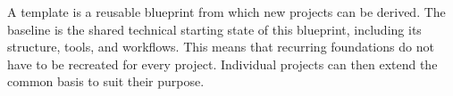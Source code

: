 \begin{beginnerstatement}

A template is a reusable blueprint from which new projects can be derived. The
baseline is the shared technical starting state of this blueprint, including
its structure, tools, and workflows. This means that recurring foundations do
not have to be recreated for every project. Individual projects can then extend
the common basis to suit their purpose.

\end{beginnerstatement}
